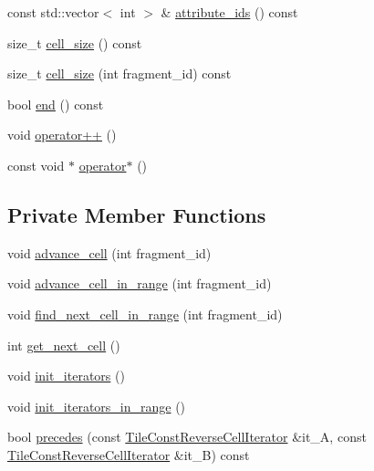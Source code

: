\begin{DoxyCompactItemize}
\item 
const std\+::vector$<$ int $>$ \& \hyperlink{classArrayConstReverseCellIterator_afaa7fc34fe9db187c6f3ed04f0e764e1}{attribute\+\_\+ids} () const 
\item 
size\+\_\+t \hyperlink{classArrayConstReverseCellIterator_a96de92a88d40ce145089db6813ed1930}{cell\+\_\+size} () const 
\item 
size\+\_\+t \hyperlink{classArrayConstReverseCellIterator_a89da199cd6cee5fcc5c1324455be4218}{cell\+\_\+size} (int fragment\+\_\+id) const 
\item 
bool \hyperlink{classArrayConstReverseCellIterator_afa2863a5cd7685db0fec535962fdde48}{end} () const 
\item 
void \hyperlink{classArrayConstReverseCellIterator_a9c85b22b45dbda42cc2d5a5761c107d4}{operator++} ()
\item 
const void $\ast$ \hyperlink{classArrayConstReverseCellIterator_a61336a02b0499f5ffe845057af0e49eb}{operator$\ast$} ()
\end{DoxyCompactItemize}
\subsection*{Private Member Functions}
\begin{DoxyCompactItemize}
\item 
void \hyperlink{classArrayConstReverseCellIterator_a87fcf5d92cb7d83ed56950e48af7aa2f}{advance\+\_\+cell} (int fragment\+\_\+id)
\item 
void \hyperlink{classArrayConstReverseCellIterator_a6262a6e2da7b91225b0c0b3c88c448b3}{advance\+\_\+cell\+\_\+in\+\_\+range} (int fragment\+\_\+id)
\item 
void \hyperlink{classArrayConstReverseCellIterator_a2c41eae75ebdda9a5b6030bc3fae4fcb}{find\+\_\+next\+\_\+cell\+\_\+in\+\_\+range} (int fragment\+\_\+id)
\item 
int \hyperlink{classArrayConstReverseCellIterator_a6735c03e3d0468b3992d4b62554b6e61}{get\+\_\+next\+\_\+cell} ()
\item 
void \hyperlink{classArrayConstReverseCellIterator_ac996e02e69b1f6168db5a5bdd02798c2}{init\+\_\+iterators} ()
\item 
void \hyperlink{classArrayConstReverseCellIterator_aeffa5a65ccd6021df873163cf09fbbf9}{init\+\_\+iterators\+\_\+in\+\_\+range} ()
\item 
bool \hyperlink{classArrayConstReverseCellIterator_aa9a07a6f8278a22ff77f30c4dda62d90}{precedes} (const \hyperlink{classTileConstReverseCellIterator}{Tile\+Const\+Reverse\+Cell\+Iterator} \&it\+\_\+\+A, const \hyperlink{classTileConstReverseCellIterator}{Tile\+Const\+Reverse\+Cell\+Iterator} \&it\+\_\+\+B) const 
\end{DoxyCompactItemize}
